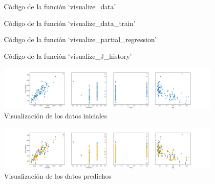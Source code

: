 \documentclass[6pt]{../../shared/AiTex}
\begin{document}
\begin{figure}[H]
    \centering
    
    \caption{Código de la función `visualize\_data'}
    \label{fig:visualize_data}
\end{figure}

\begin{figure}[H]
    \centering
    
    \caption{Código de la función `visualize\_data\_train'}
    \label{fig:visualize_data_train}
\end{figure}

\begin{figure}[H]
    \centering
    
    \caption{Código de la función `visualize\_partial\_regression'}
    \label{fig:visualize_partial_reggression}
\end{figure}

\begin{figure}[H]
    \centering
    
    \caption{Código de la función `visualize\_J\_history'}
    \label{fig:visualize_J_history}
\end{figure}

\begin{figure}[H]
    \centering
    \includegraphics[width=\textwidth]{./images/visualizacion_inicial.png}
    \caption{Visualización de los datos iniciales}
    \label{fig:data}
\end{figure}

\begin{figure}[H]
    \centering
    \includegraphics[width=\textwidth]{./images/predicted_data.png}
    \caption{Visualización de los datos predichos}
    \label{fig:data_train}
\end{figure}
\end{document}
